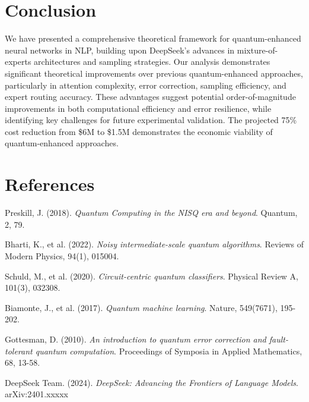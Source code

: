 \documentclass{article}
\begin{document}
\section{Conclusion}
We have presented a comprehensive theoretical framework for quantum-enhanced neural networks in NLP, building upon DeepSeek's advances in mixture-of-experts architectures and sampling strategies. Our analysis demonstrates significant theoretical improvements over previous quantum-enhanced approaches, particularly in attention complexity, error correction, sampling efficiency, and expert routing accuracy. These advantages suggest potential order-of-magnitude improvements in both computational efficiency and error resilience, while identifying key challenges for future experimental validation. The projected 75\% cost reduction from \$6M to \$1.5M demonstrates the economic viability of quantum-enhanced approaches.

\section{References}
\begin{thebibliography}{9}

Preskill, J. (2018).
\textit{Quantum Computing in the NISQ era and beyond}.
Quantum, 2, 79.

Bharti, K., et al. (2022).
\textit{Noisy intermediate-scale quantum algorithms}.
Reviews of Modern Physics, 94(1), 015004.

Schuld, M., et al. (2020).
\textit{Circuit-centric quantum classifiers}.
Physical Review A, 101(3), 032308.

Biamonte, J., et al. (2017).
\textit{Quantum machine learning}.
Nature, 549(7671), 195-202.

Gottesman, D. (2010).
\textit{An introduction to quantum error correction and fault-tolerant quantum computation}.
Proceedings of Symposia in Applied Mathematics, 68, 13-58.

DeepSeek Team. (2024).
\textit{DeepSeek: Advancing the Frontiers of Language Models}.
arXiv:2401.xxxxx

\end{thebibliography}
\end{document}
